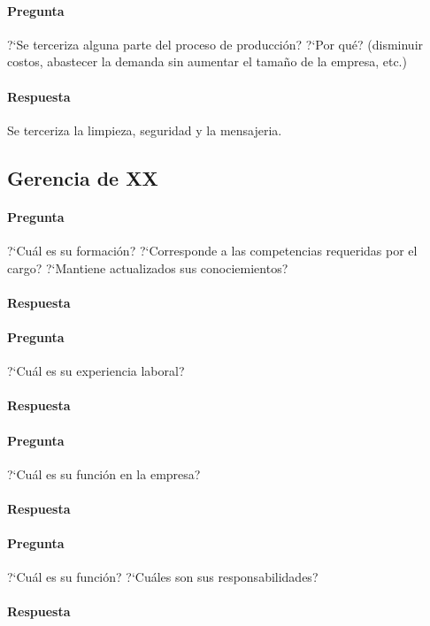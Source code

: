\documentclass[12pt,a4paper,spanish]{article}
\begin{document}
	\paragraph{Pregunta}
	 ?`Se terceriza alguna parte del proceso de producci\'on?  ?`Por qu\'e? (disminuir costos, abastecer la demanda sin aumentar el tama\~{n}o de la empresa, etc.)
	\paragraph{Respuesta}
	Se terceriza la limpieza, seguridad  y la mensajeria. 

	\subsection{Gerencia de XX}

	\paragraph{Pregunta}
	 ?`Cu\'al es su formaci\'on?  ?`Corresponde a las competencias requeridas por el cargo?  ?`Mantiene actualizados sus conociemientos?
	\paragraph{Respuesta}

	\paragraph{Pregunta}
	 ?`Cu\'al es su experiencia laboral?
	\paragraph{Respuesta}

	\paragraph{Pregunta}
	 ?`Cu\'al es su funci\'on en la empresa?
	\paragraph{Respuesta}

	\paragraph{Pregunta}
	 ?`Cu\'al es su funci\'on?  ?`Cu\'ales son sus responsabilidades?
	\paragraph{Respuesta}
\end{document}
